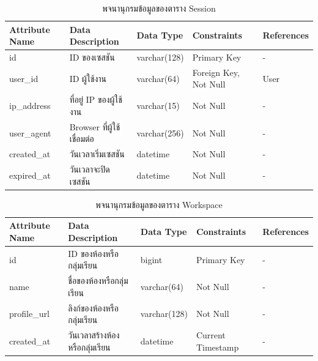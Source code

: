 \documentclass[12pt,one side,openright,a4paper]{cpe-thesis-th}
\begin{document}
\begin{table}[H]
  \centering
  \caption{พจนานุกรมข้อมูลของตาราง Session}\label{tbl:data-dict-session}
  \begin{tabular}{p{2cm}|p{4cm}p{2cm}p{3cm}p{2cm}} \hline\hline
    Attribute Name & Data Description   & Data Type    & Constraints           & References \\ \hline\hline
    id             & ID ของเซสชัน        & varchar(128) & Primary Key           & -          \\
    user\_id       & ID ผู้ใช้งาน          & varchar(64)  & Foreign Key, Not Null & User       \\
    ip\_address    & ที่อยู่ IP ของผู้ใช้งาน   & varchar(15)  & Not Null              & -          \\
    user\_agent    & Browser ที่ผู้ใช้เชื่อมต่อ & varchar(256) & Not Null              & -          \\
    created\_at    & วันเวลาเริ่มเซสชัน     & datetime     & Not Null              & -          \\
    expired\_at    & วันเวลาจะปิดเซสชัน    & datetime     & Not Null              & -          \\ \hline\hline
  \end{tabular}
\end{table}
\begin{table}[H]
  \centering
  \caption{พจนานุกรมข้อมูลของตาราง Workspace}\label{tbl:data-dict-workspace}
  \begin{tabular}{p{2cm}|p{4cm}p{2cm}p{3cm}p{2cm}} \hline\hline
    Attribute Name & Data Description        & Data Type    & Constraints       & References \\ \hline\hline
    id             & ID ของห้องหรือกลุ่มเรียน     & bigint       & Primary Key       & -          \\
    name           & ชื่อของห้องหรือกลุ่มเรียน      & varchar(64)  & Not Null          & -          \\
    profile\_url   & ลิงก์ของห้องหรือกลุ่มเรียน     & varchar(128) & Not Null          & -          \\
    created\_at    & วันเวลาสร้างห้องหรือกลุ่มเรียน & datetime     & Current Timestamp & -          \\ \hline\hline
  \end{tabular}
\end{table}
\end{document}
